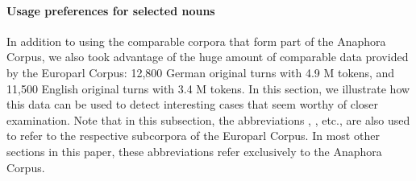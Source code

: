 \documentclass[output=paper]{LSP/langsci}
\begin{document}




\paragraph*{Usage preferences for selected nouns}


In addition to using the comparable corpora that form part of the Anaphora Corpus, we also took advantage of the huge amount of comparable data provided by the Europarl Corpus: 12,800 German original turns with 4.9 M tokens, and 11,500 English original turns with 3.4 M tokens. In this section, we illustrate how this data can be used to detect interesting cases that seem worthy of closer examination. Note that in this subsection, the abbreviations \DEo, \DEt, etc., are also used to refer to the respective subcorpora of the Europarl Corpus. In most other sections in this paper, these abbreviations refer exclusively to the Anaphora Corpus.
\end{document}
